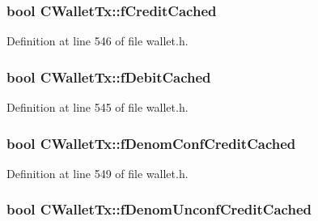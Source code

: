 \subsubsection[{f\+Credit\+Cached}]{\setlength{\rightskip}{0pt plus 5cm}bool C\+Wallet\+Tx\+::f\+Credit\+Cached\hspace{0.3cm}{\ttfamily [mutable]}}\label{class_c_wallet_tx_ad896ca73e00251f900185a1114c3c506}


Definition at line 546 of file wallet.\+h.

\hypertarget{class_c_wallet_tx_ad2dca68c99f2e677e5999c9872a269da}{}
\subsubsection[{f\+Debit\+Cached}]{\setlength{\rightskip}{0pt plus 5cm}bool C\+Wallet\+Tx\+::f\+Debit\+Cached\hspace{0.3cm}{\ttfamily [mutable]}}\label{class_c_wallet_tx_ad2dca68c99f2e677e5999c9872a269da}


Definition at line 545 of file wallet.\+h.

\hypertarget{class_c_wallet_tx_a73a6308df83f13853a1891ef67c2d199}{}
\subsubsection[{f\+Denom\+Conf\+Credit\+Cached}]{\setlength{\rightskip}{0pt plus 5cm}bool C\+Wallet\+Tx\+::f\+Denom\+Conf\+Credit\+Cached\hspace{0.3cm}{\ttfamily [mutable]}}\label{class_c_wallet_tx_a73a6308df83f13853a1891ef67c2d199}


Definition at line 549 of file wallet.\+h.

\hypertarget{class_c_wallet_tx_a11197a5edda9bbfa66fe94eab1329a51}{}
\subsubsection[{f\+Denom\+Unconf\+Credit\+Cached}]{\setlength{\rightskip}{0pt plus 5cm}bool C\+Wallet\+Tx\+::f\+Denom\+Unconf\+Credit\+Cached\hspace{0.3cm}{\ttfamily [mutable]}}\label{class_c_wallet_tx_a11197a5edda9bbfa66fe94eab1329a51}


